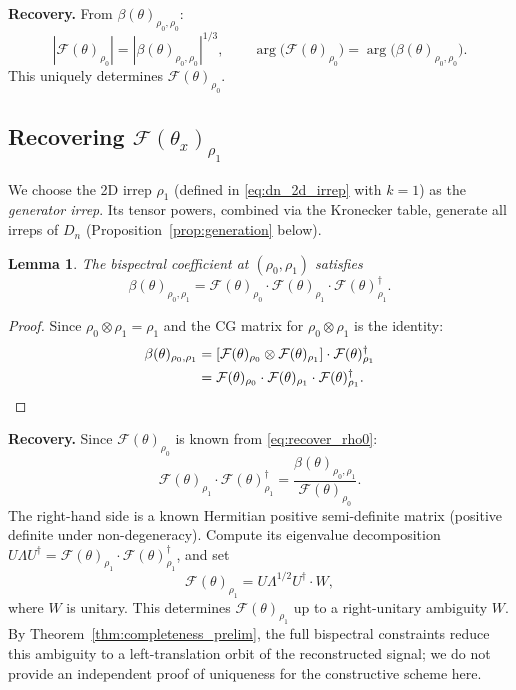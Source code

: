 \documentclass{article}
\newtheorem{lemma}[theorem]{Lemma}
\theoremstyle{definition}
\theoremstyle{remark}
\newcommand{\FF}{\mathcal{F}}
\begin{document}
\textbf{Recovery.} From $\beta(\theta)_{\rho_0,\rho_0}$:
\begin{equation}\label{eq:recover_rho0}
|\FF(\theta)_{\rho_0}| = |\beta(\theta)_{\rho_0,\rho_0}|^{1/3}, \qquad
\arg\bigl(\FF(\theta)_{\rho_0}\bigr) = \arg\bigl(\beta(\theta)_{\rho_0,\rho_0}\bigr).
\end{equation}
This uniquely determines $\FF(\theta)_{\rho_0}$.

\subsection{Recovering $\FF(\theta_x)_{\rho_1}$}

We choose the 2D irrep $\rho_1$ (defined in \eqref{eq:dn_2d_irrep} with $k = 1$) as the \textit{generator irrep}. Its tensor powers, combined via the Kronecker table, generate all irreps of $D_n$ (Proposition~\ref{prop:generation} below).

\begin{lemma}\label{lem:recover_rho1}
The bispectral coefficient at $(\rho_0, \rho_1)$ satisfies
\begin{equation}\label{eq:beta_01}
\beta(\theta)_{\rho_0, \rho_1} = \FF(\theta)_{\rho_0} \cdot \FF(\theta)_{\rho_1} \cdot \FF(\theta)_{\rho_1}^\dagger.
\end{equation}
\end{lemma}
\begin{proof}
Since $\rho_0 \otimes \rho_1 = \rho_1$ and the CG matrix for $\rho_0 \otimes \rho_1$ is the identity:
\begin{align*}
\beta(\theta)_{\rho_0, \rho_1}
&= [\FF(\theta)_{\rho_0} \otimes \FF(\theta)_{\rho_1}] \cdot \FF(\theta)_{\rho_1}^\dagger \\
&= \FF(\theta)_{\rho_0} \cdot \FF(\theta)_{\rho_1} \cdot \FF(\theta)_{\rho_1}^\dagger. \qedhere
\end{align*}
\end{proof}

\textbf{Recovery.} Since $\FF(\theta)_{\rho_0}$ is known from \eqref{eq:recover_rho0}:
\begin{equation}\label{eq:recover_rho1_gram}
\FF(\theta)_{\rho_1} \cdot \FF(\theta)_{\rho_1}^\dagger = \frac{\beta(\theta)_{\rho_0, \rho_1}}{\FF(\theta)_{\rho_0}}.
\end{equation}
The right-hand side is a known Hermitian positive semi-definite matrix (positive definite under non-degeneracy). Compute its eigenvalue decomposition $U \Lambda U^\dagger = \FF(\theta)_{\rho_1} \cdot \FF(\theta)_{\rho_1}^\dagger$, and set
\begin{equation}\label{eq:recover_rho1}
\FF(\theta)_{\rho_1} = U \Lambda^{1/2} U^\dagger \cdot W,
\end{equation}
where $W$ is unitary. This determines $\FF(\theta)_{\rho_1}$ up to a right-unitary ambiguity $W$. By Theorem~\ref{thm:completeness_prelim}, the full bispectral constraints reduce this ambiguity to a left-translation orbit of the reconstructed signal; we do not provide an independent proof of uniqueness for the constructive scheme here.
\end{document}
